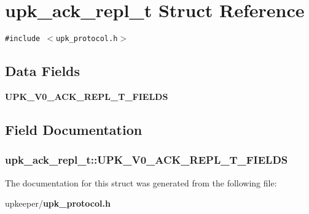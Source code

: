 \section{upk\_\-ack\_\-repl\_\-t Struct Reference}
\label{structupk__ack__repl__t}
{\tt \#include $<$upk\_\-protocol.h$>$}

\subsection*{Data Fields}
\begin{CompactItemize}
\item 
\bf{UPK\_\-V0\_\-ACK\_\-REPL\_\-T\_\-FIELDS}
\end{CompactItemize}


\subsection{Field Documentation}
\subsubsection{\setlength{\rightskip}{0pt plus 5cm}\bf{upk\_\-ack\_\-repl\_\-t::UPK\_\-V0\_\-ACK\_\-REPL\_\-T\_\-FIELDS}}\label{structupk__ack__repl__t_367f080ee8eca7a88f88b8fa280fd3a2}




The documentation for this struct was generated from the following file:\begin{CompactItemize}
\item 
upkeeper/\bf{upk\_\-protocol.h}\end{CompactItemize}
